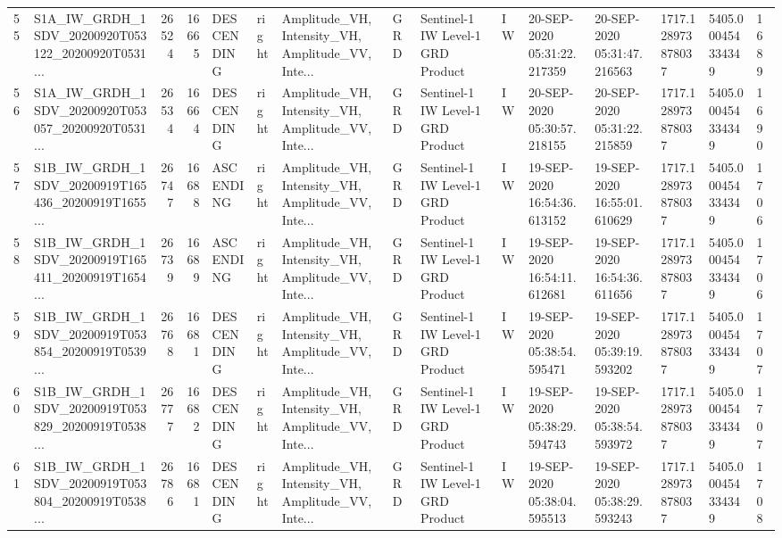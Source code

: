 \begin{tabular}{llrrlllllllllll}
55  &  S1A\_IW\_GRDH\_1SDV\_20200920T053122\_20200920T0531... &  26524 &   16665 &  DESCENDING &  right &  Amplitude\_VH, Intensity\_VH, Amplitude\_VV, Inte... &          GRD &  Sentinel-1 IW Level-1 GRD Product &              IW &  20-SEP-2020 05:31:22.217359 &  20-SEP-2020 05:31:47.216563 &          1717.128973878037 &  5405.000454334349 &       1689 \\
56  &  S1A\_IW\_GRDH\_1SDV\_20200920T053057\_20200920T0531... &  26534 &   16664 &  DESCENDING &  right &  Amplitude\_VH, Intensity\_VH, Amplitude\_VV, Inte... &          GRD &  Sentinel-1 IW Level-1 GRD Product &              IW &  20-SEP-2020 05:30:57.218155 &  20-SEP-2020 05:31:22.215859 &          1717.128973878037 &  5405.000454334349 &       1690 \\
57  &  S1B\_IW\_GRDH\_1SDV\_20200919T165436\_20200919T1655... &  26747 &   16688 &   ASCENDING &  right &  Amplitude\_VH, Intensity\_VH, Amplitude\_VV, Inte... &          GRD &  Sentinel-1 IW Level-1 GRD Product &              IW &  19-SEP-2020 16:54:36.613152 &  19-SEP-2020 16:55:01.610629 &          1717.128973878037 &  5405.000454334349 &       1706 \\
58  &  S1B\_IW\_GRDH\_1SDV\_20200919T165411\_20200919T1654... &  26739 &   16689 &   ASCENDING &  right &  Amplitude\_VH, Intensity\_VH, Amplitude\_VV, Inte... &          GRD &  Sentinel-1 IW Level-1 GRD Product &              IW &  19-SEP-2020 16:54:11.612681 &  19-SEP-2020 16:54:36.611656 &          1717.128973878037 &  5405.000454334349 &       1706 \\
59  &  S1B\_IW\_GRDH\_1SDV\_20200919T053854\_20200919T0539... &  26768 &   16681 &  DESCENDING &  right &  Amplitude\_VH, Intensity\_VH, Amplitude\_VV, Inte... &          GRD &  Sentinel-1 IW Level-1 GRD Product &              IW &  19-SEP-2020 05:38:54.595471 &  19-SEP-2020 05:39:19.593202 &          1717.128973878037 &  5405.000454334349 &       1707 \\
60  &  S1B\_IW\_GRDH\_1SDV\_20200919T053829\_20200919T0538... &  26777 &   16682 &  DESCENDING &  right &  Amplitude\_VH, Intensity\_VH, Amplitude\_VV, Inte... &          GRD &  Sentinel-1 IW Level-1 GRD Product &              IW &  19-SEP-2020 05:38:29.594743 &  19-SEP-2020 05:38:54.593972 &          1717.128973878037 &  5405.000454334349 &       1707 \\
61  &  S1B\_IW\_GRDH\_1SDV\_20200919T053804\_20200919T0538... &  26786 &   16681 &  DESCENDING &  right &  Amplitude\_VH, Intensity\_VH, Amplitude\_VV, Inte... &          GRD &  Sentinel-1 IW Level-1 GRD Product &              IW &  19-SEP-2020 05:38:04.595513 &  19-SEP-2020 05:38:29.593243 &          1717.128973878037 &  5405.000454334349 &       1708 \\

\end{tabular}
